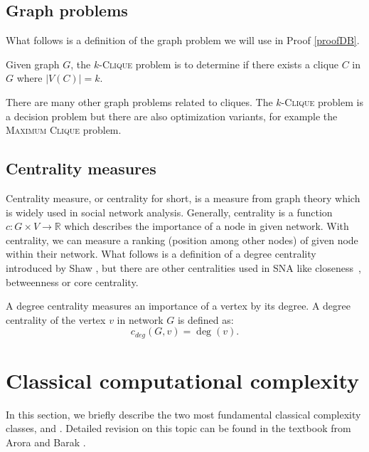 \subsection{Graph problems}

What follows is a definition of the \NPh graph problem we will use in Proof \ref{proofDB}.

\begin{definition}
    Given graph $G$, the $k$-\textsc{Clique} problem is to determine if
    there exists a clique $C$ in $G$ where $|V(C)| = k$.
\end{definition}

There are many other graph problems related to cliques. The $k$-\textsc{Clique} problem is a decision problem but
there are also optimization variants, for example the \textsc{Maximum Clique} problem.


\subsection{Centrality measures}

Centrality measure, or centrality for short, is a measure from graph theory which is widely used in social network analysis.
Generally, centrality is a function $c: G \times V \rightarrow \mathbb{R}$ which describes the importance of a node in given network.
With centrality, we can measure a ranking (position among other nodes) of given node within their network.
What follows is a definition of a degree centrality introduced by Shaw \cite{Shaw1954}, but there are other centralities used in SNA like
closeness~\cite{Beauchamp1965}, betweenness \cite{Anthonisse1971,Freeman1977} or core \cite{Seidman1983} centrality.

\begin{definition}
    A degree centrality measures an importance of a vertex by its degree.
    A degree centrality of the vertex $v$ in network $G$ is defined as:
    $$c_{deg}(G, v) = \deg(v).$$
\end{definition}


\section{Classical computational complexity}

In this section, we briefly describe the two most fundamental classical complexity classes, \Po and \NP.
Detailed revision on this topic can be found in the textbook from Arora and Barak \cite{Arora2009}.

